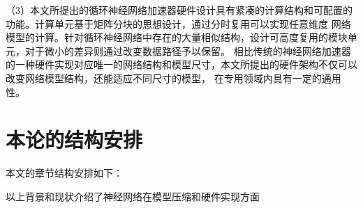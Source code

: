 （3）本文所提出的循环神经网络加速器硬件设计具有紧凑的计算结构和可配置的功能。计算单元基于矩阵分块的思想设计，通过分时复用可以实现任意维度
网络模型的计算。针对循环神经网络中存在的大量相似结构，设计可高度复用的模块单元，对于微小的差异则通过改变数据路径予以保留。
相比传统的神经网络加速器　的一种硬件实现对应唯一的网络结构和模型尺寸，本文所提出的硬件架构不仅可以改变网络模型结构，还能适应不同尺寸的模型，
在专用领域内具有一定的通用性。

\section{本论的结构安排}
本文的章节结构安排如下：

以上背景和现状介绍了神经网络在模型压缩和硬件实现方面








%




%

